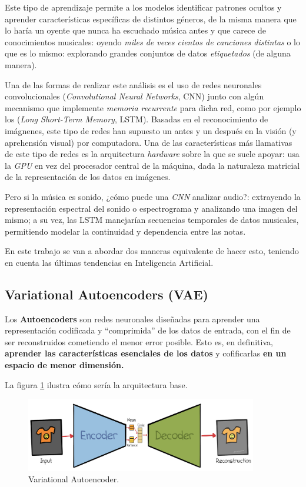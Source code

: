 Este tipo de aprendizaje permite a los modelos identificar patrones ocultos y aprender características específicas de distintos géneros, de la misma manera que lo haría un oyente que nunca ha escuchado música antes y que carece de conocimientos musicales: oyendo \emph{miles de veces cientos de canciones distintas} o lo que es lo mismo: explorando grandes conjuntos de datos \emph{etiquetados} (de alguna manera).

Una de las formas de realizar este análisis es el uso de redes neuronales convolucionales (\emph{Convolutional Neural Networks}, CNN) junto con algún mecanismo que implemente \emph{memoria recurrente} para dicha red, como por ejemplo los (\emph{Long Short-Term Memory}, LSTM). Basadas en el reconocimiento de imágnenes, este tipo de redes han supuesto un antes y un después en la visión (y aprehensión visual) por computadora. Una de las características más llamativas de este tipo de redes es la arquitectura \emph{hardware} sobre la que se suele apoyar: usa la \emph{GPU} en vez del procesador central de la máquina, dada la naturaleza matricial de la representación de los datos en imágenes.

Pero si la música es sonido, ¿cómo puede una \emph{CNN} analizar audio?: extrayendo la representación espectral del sonido o espectrograma y analizando una imagen del mismo; a su vez, las LSTM manejarían secuencias temporales de datos musicales, permitiendo modelar la continuidad y dependencia entre las notas.

En este trabajo se van a abordar dos maneras equivalente de hacer esto, teniendo en cuenta las últimas tendencias en Inteligencia Artificial.

\subsection{Variational Autoencoders (VAE)}

Los \textbf{Autoencoders} son redes neuronales diseñadas para aprender una representación codificada y ``comprimida'' de los datos de entrada, con el fin de ser reconstruidos cometiendo el menor error posible. Esto es, en definitiva, \textbf{aprender las características esenciales de los datos} y cofificarlas \textbf{en un espacio de menor dimensión.}

La figura \ref{fig:vae} ilustra cómo sería la arquitectura base.

\begin{figure}[H]
  \centering
  \includegraphics[width=0.9\textwidth]{images/vae.png}
  \caption{Variational Autoencoder.}
  \label{fig:vae}
\end{figure}

